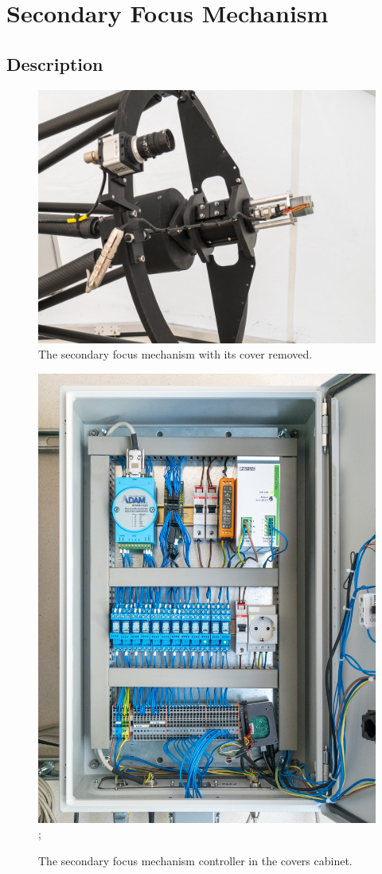 
\chapter{Secondary Focus Mechanism}
\label{chapter:secondary}

\section{Description}

\begin{figure}
\begin{center}
\includegraphics[width=0.7\linewidth]{figures/secondary-coatli-mechanism.jpg}
\caption{The secondary focus mechanism with its cover removed.}
\label{figure:secondary-mechanism}
\end{center}
\end{figure}

\begin{figure}
\begin{center}
\begin{labeled}{\includegraphics[width=0.6\linewidth]{figures/secondary-coatli-controller.jpg}}
;
\end{labeled}
\caption{The secondary focus mechanism controller in the covers cabinet.}
\label{figure:secondary-controller}
\end{center}
\end{figure}

